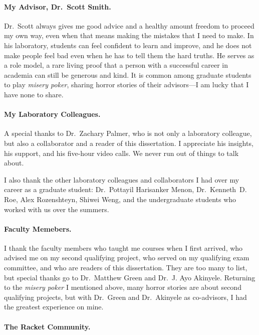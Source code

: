 \documentclass[12pt, oneside]{book}
\begin{document}
\paragraph{My Advisor, Dr.~Scott Smith.}

Dr.~Scott always gives me good advice and a healthy amount freedom to proceed my own way, even when that means making the mistakes that I need to make. In his laboratory, students can feel confident to learn and improve, and he does not make people feel bad even when he has to tell them the hard truths. He serves as a role model, a rare living proof that a person with a successful career in academia can still be generous and kind. It is common among graduate students to play \emph{misery poker}, sharing horror stories of their advisors—I am lucky that I have none to share.

\paragraph{My Laboratory Colleagues.}

A special thanks to Dr.~Zachary Palmer, who is not only a laboratory colleague, but also a collaborator and a reader of this dissertation. I appreciate his insights, his support, and his five-hour video calls. We never run out of things to talk about.

I also thank the other laboratory colleagues and collaborators I had over my career as a graduate student: Dr.~Pottayil Harisanker Menon, Dr.~Kenneth~D. Roe, Alex Rozenshteyn, Shiwei Weng, and the undergraduate students who worked with us over the summers.

\paragraph{Faculty Memebers.}

I thank the faculty members who taught me courses when I first arrived, who advised me on my second qualifying project, who served on my qualifying exam committee, and who are readers of this dissertation. They are too many to list, but special thanks go to Dr.~Matthew Green and Dr.~J. Ayo Akinyele. Returning to the \emph{misery poker} I mentioned above, many horror stories are about second qualifying projects, but with Dr.~Green and Dr.~Akinyele as co-advisors, I had the greatest experience on mine.

\paragraph{The Racket Community.}
\end{document}
